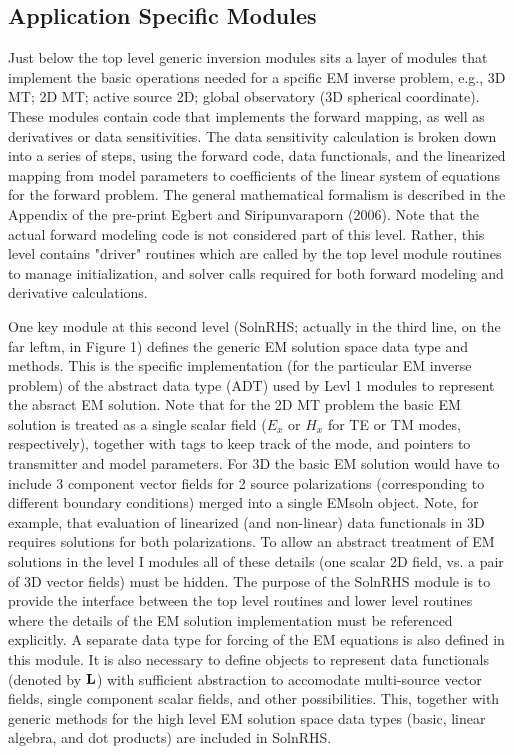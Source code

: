 \documentclass[12pt]{article}
\begin{document}
\subsection{Application Specific Modules}
Just below the top level generic inversion modules sits
a layer of modules that implement the basic operations needed
for a spcific EM inverse problem, e.g., 3D MT; 2D MT; active source 2D;
global observatory (3D spherical coordinate).  These modules contain
code that implements the forward mapping, as well as derivatives
or data sensitivities.  The data sensitivity calculation is broken
down into a series of steps, using the forward code, data functionals,
and the linearized mapping from model parameters to coefficients
of the linear system of equations for the forward problem.
The general mathematical formalism is described in the Appendix
of the pre-print Egbert and Siripunvaraporn (2006).
Note that the actual forward modeling code is not considered
part of this level.  Rather, this level contains "driver" routines
which are called by the top level module routines to manage
initialization, and solver calls required for both forward modeling
and derivative calculations.  

One key module at this second level
(SolnRHS; actually in the third line, on
the far leftm, in Figure 1) defines the generic EM solution space data type
and methods.  This is the specific implementation (for the particular
EM inverse problem) of the abstract data type (ADT) used by Levl 1
modules to represent the absract EM solution.  Note that
for the 2D MT problem the basic EM solution is treated as 
a single scalar field ($E_x$ or $H_x$ for TE  or TM modes, respectively),
together with tags to keep track of the mode, and pointers to 
transmitter and model parameters.
For 3D the basic EM solution would have to include 3 component
vector fields for 2 source polarizations (corresponding to different boundary 
conditions) merged into a single EMsoln object.
Note, for example, that evaluation of linearized (and non-linear)
data functionals in 3D requires solutions for both polarizations.
To allow an abstract treatment of EM solutions in the level I modules
all of these details (one scalar 2D field, vs. a pair of 3D vector fields) 
must be hidden.  The purpose of the SolnRHS module is to provide
the interface between the top level routines and lower level
routines where the details of the EM solution implementation must
be referenced explicitly.  A separate data type for forcing of the
EM equations is also defined in this module.
It is also necessary
to define objects to represent data functionals  (denoted
by $\bf L$) with sufficient
abstraction to accomodate multi-source vector fields, single
component scalar fields, and other possibilities. 
This, together with generic methods for the high level
EM solution space data types (basic, linear
algebra, and dot products) are included in SolnRHS.
\end{document}

